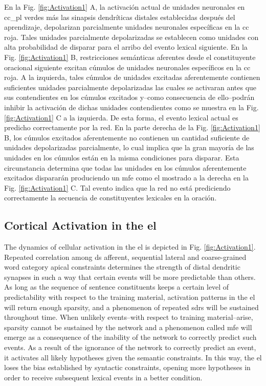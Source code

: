 {En la Fig. \ref{fig:Activation1} A, la activación actual de unidades neuronales en \gls{cc_pl} verdes más las sinapsis dendríticas distales establecidas después del aprendizaje, depolarizan parcialmente unidades neuronales específicas en la \gls{cc} roja.
Tales unidades parcialmente depolarizadas se establecen como unidades con alta probabilidad de disparar para el arribo del evento lexical siguiente.
En la Fig. \ref{fig:Activation1} B, restricciones semánticas aferentes desde el constituyente oracional siguiente excitan cúmulos de unidades neuronales específicos en la \gls{cc} roja.
A la izquierda, tales cúmulos de unidades excitadas aferentemente contienen suficientes unidades parcialmente depolarizadas las cuales se activaran antes que sus contendientes en los cúmulos excitados y--como consecuencia de ello--podrán inhibir la activación de dichas unidades contendientes como se muestra en la Fig. \ref{fig:Activation1} C a la izquierda.
De esta forma, el evento lexical actual es predicho correctamente por la red.
En la parte derecha de la Fig. \ref{fig:Activation1} B, los cúmulos excitados aferentemente no contienen un cantidad suficiente de unidades depolarizadas parcialmente, lo cual implica que la gran mayoría de las unidades en los cúmulos están en la misma condiciones para disparar.
Esta circunstancia determina que todas las unidades en los cúmulos aferentemente excitados dispararán produciendo un \gls{mfe} como el mostrado a la derecha en la Fig. \ref{fig:Activation1} C. 
Tal evento indica que la red no está prediciendo correctamente la secuencia de constituyentes lexicales en la oración.
}{
\subsection{Cortical Activation in the \gls{el}}

The dynamics of cellular activation in the \gls{el} is depicted in Fig. \ref{fig:Activation1}.
Repeated correlation among \gls{ds} afferent, sequential lateral and coarse-grained word category apical constraints determines the strength of distal dendritic synapses in such a way that certain events will be more predictable than others. As long as the sequence of sentence constituents keeps a certain level of predictability with respect to the training material, activation patterns in the \gls{el} will return enough sparsity, and a phenomenon of repeated \glspl{sdr} will be sustained throughout time. When unlikely events--with respect to training material--arise, sparsity cannot be sustained by the network and a phenomenon called \gls{mfe} will emerge as a consequence of the inability of the network to correctly predict such events. As a result of the ignorance of the network to correctly predict an event, it activates all likely hypotheses given the semantic constraints. In this way, the \gls{el} loses the bias established by syntactic constraints, opening more hypotheses in order to receive subsequent lexical events in a better condition.

}
